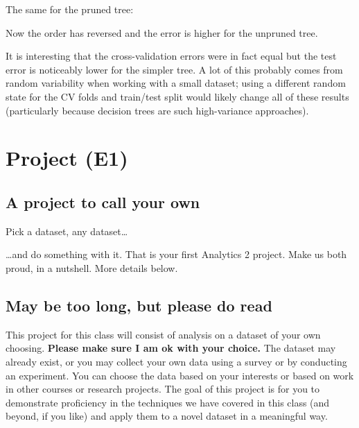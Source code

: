 \documentclass[
]{book}
\newenvironment{Shaded}{\begin{snugshade}}{\end{snugshade}}
\newcommand{\AttributeTok}[1]{\textcolor[rgb]{0.77,0.63,0.00}{#1}}
\newcommand{\CommentTok}[1]{\textcolor[rgb]{0.56,0.35,0.01}{\textit{#1}}}
\newcommand{\FunctionTok}[1]{\textcolor[rgb]{0.00,0.00,0.00}{#1}}
\newcommand{\NormalTok}[1]{#1}
\newcommand{\SpecialCharTok}[1]{\textcolor[rgb]{0.00,0.00,0.00}{#1}}
\newcommand{\StringTok}[1]{\textcolor[rgb]{0.31,0.60,0.02}{#1}}
\begin{document}
The same for the pruned tree:

\begin{Shaded}
\end{Shaded}

Now the order has reversed and the error is higher for the unpruned tree.

It is interesting that the cross-validation errors were in fact equal but the test error is noticeably lower for the simpler tree. A lot of this probably comes from random variability when working with a small dataset; using a different random state for the CV folds and train/test split would likely change all of these results (particularly because decision trees are such high-variance approaches).

\hypertarget{project-e1}{%
\chapter{Project (E1)}\label{project-e1}}

\hypertarget{a-project-to-call-your-own}{%
\section{A project to call your own}\label{a-project-to-call-your-own}}

Pick a dataset, any dataset\ldots{}

\ldots and do something with it. That is your first Analytics 2 project. Make us both proud, in a nutshell. More details below.

\hypertarget{may-be-too-long-but-please-do-read}{%
\section{May be too long, but please do read}\label{may-be-too-long-but-please-do-read}}

This project for this class will consist of analysis on a dataset of your own
choosing. \textbf{Please make sure I am ok with your choice.} The dataset may already exist,
or you may collect your own data using a
survey or by conducting an experiment. You can choose the data based on your interests
or based on work in other courses or research projects. The goal of this project is for
you to demonstrate proficiency in the techniques we have covered in this class (and
beyond, if you like) and apply them to a novel dataset in a meaningful way.
\end{document}
